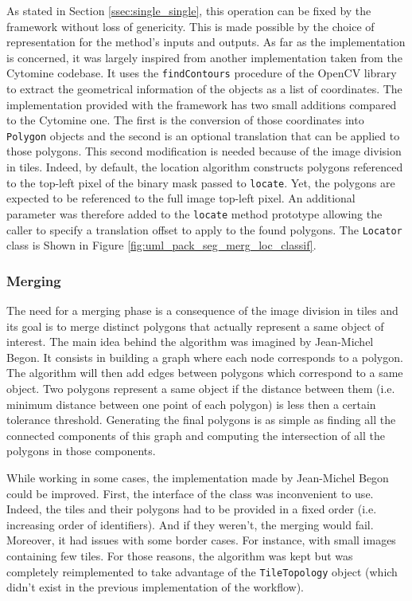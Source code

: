 As stated in Section \ref{ssec:single_single}, this operation can be fixed by the framework without loss of genericity. This is made possible by the choice of representation for the method's inputs and outputs. As far as the implementation is concerned, it was largely inspired from another implementation taken from the Cytomine codebase. It uses the \texttt{findContours} procedure of the OpenCV library to extract the geometrical information of the objects as a list of coordinates. The implementation provided with the framework has two small additions compared to the Cytomine one. The first is the conversion of those coordinates into \texttt{Polygon} objects and the second is an optional translation that can be applied to those polygons. This second modification is needed because of the image division in tiles. Indeed, by default, the location algorithm constructs polygons referenced to the top-left pixel of the binary mask passed to \texttt{locate}. Yet, the polygons are expected to be referenced to the full image top-left pixel. An additional parameter was therefore added to the \texttt{locate} method prototype allowing the caller to specify a translation offset to apply to the found polygons. The \texttt{Locator} class is Shown in Figure \ref{fig:uml_pack_seg_merg_loc_classif}.

\subsubsection{Merging}
\label{sssec:merging}
The need for a merging phase is a consequence of the image division in tiles and its goal is to merge distinct polygons that actually represent a same object of interest. The main idea behind the algorithm was imagined by Jean-Michel Begon. It consists in building a graph where each node corresponds to a polygon. The algorithm will then add edges between polygons which correspond to a same object. Two polygons represent a same object if the distance between them (i.e. minimum distance between one point of each polygon) is less then a certain tolerance threshold. Generating the final polygons is as simple as finding all the connected components of this graph and computing the intersection of all the polygons in those components. 

While working in some cases, the implementation made by Jean-Michel Begon could be improved. First, the interface of the class was inconvenient to use. Indeed, the tiles and their polygons had to be provided in a fixed order (i.e. increasing order of identifiers). And if they weren't, the merging would fail. Moreover, it had issues with some border cases. For instance, with small images containing few tiles. For those reasons, the algorithm was kept but was completely reimplemented to take advantage of the \texttt{TileTopology} object (which didn't exist in the previous implementation of the workflow). 


